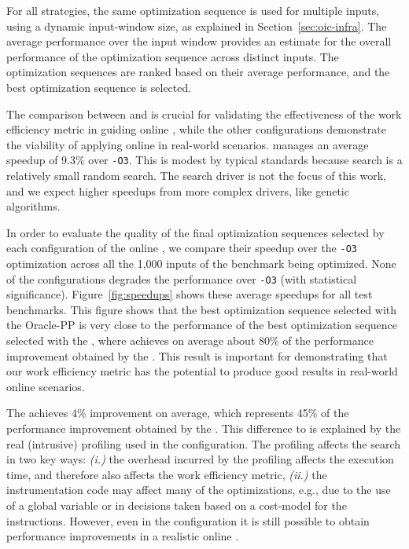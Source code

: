 For all strategies, the same optimization sequence is used for multiple inputs, using a dynamic input-window size, as explained in
Section~\ref{sec:oic-infra}. The average performance over the input window provides an estimate for the overall performance of the
optimization sequence across distinct inputs. The optimization sequences are ranked based on their average performance, and the best
optimization sequence is selected.

The comparison between \OracleRM and \OraclePP is crucial for validating the
effectiveness of the work efficiency metric in guiding online {\itercomp},
while the other configurations demonstrate the viability of applying online
{\itercomp} in real-world scenarios. \OracleRM manages an average speedup of 9.3\% over \texttt{-O3}. This is modest by typical \itercomp
standards because search is a relatively small random search. The search driver is not the focus of this work, and we expect higher speedups from more complex drivers, like genetic algorithms.

In order to evaluate the quality of the final optimization sequences selected by each configuration of the online {\itercomp}, we compare
their speedup over the \texttt{-O3} optimization across all the 1,000 inputs of the benchmark being optimized. None of the configurations
degrades the performance over \texttt{-O3} (with statistical significance).
Figure~\ref{fig:speedups} shows these average speedups for all test benchmarks.
This figure shows that the best optimization sequence selected with the Oracle-PP
is very close to the performance of the best optimization sequence selected with
the \OracleRM, where \OraclePP achieves on average about 80\% of the performance
improvement obtained by the \OracleRM.
This result is important for demonstrating that our work efficiency metric has
the potential to produce good results in real-world online scenarios.

The \OptProf achieves 4\% improvement on average, which represents 45\% of the
performance improvement obtained by the \OracleRM.
This difference to \OraclePP is explained by the real (intrusive) profiling used
in the \OptProf configuration.
The profiling affects the search in two key ways:
\textit{(i.)} the overhead incurred by the profiling affects the execution time,
and therefore also affects the work efficiency metric,
\textit{(ii.)} the instrumentation code may affect many of the optimizations, e.g.,
due to the use of a global variable or in decisions taken based on a cost-model
for the instructions.
However, even in the \OptProf configuration
it is still possible to obtain performance improvements in a realistic online
{\itercomp}.

